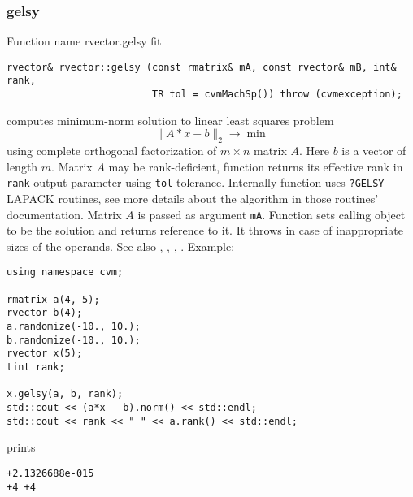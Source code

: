 \subsubsection{gelsy}
Function%
\pdfdest name {rvector.gelsy} fit
\begin{verbatim}
rvector& rvector::gelsy (const rmatrix& mA, const rvector& mB, int& rank,
                         TR tol = cvmMachSp()) throw (cvmexception);
\end{verbatim}
computes minimum-norm solution to linear
least squares problem 
\begin{equation*}
\|A*x-b\|_2\to\min
\end{equation*}
using complete orthogonal factorization of $m\times n$ matrix $A$.
Here $b$ is a vector of length $m$.
Matrix $A$ may be rank-deficient, function returns its effective rank in \verb"rank"
output parameter using \verb"tol" tolerance.
Internally  function uses \verb"?GELSY" LAPACK routines, see more details
about the algorithm in those routines' documentation.
Matrix $A$ is passed as argument \verb"mA".
Function sets calling object to be the solution and returns reference to it.
It throws
in case of inappropriate sizes of the operands.
See also , 
, , 
.
Example:
\begin{Verbatim}
using namespace cvm;

rmatrix a(4, 5);
rvector b(4);
a.randomize(-10., 10.);
b.randomize(-10., 10.);
rvector x(5);
tint rank;

x.gelsy(a, b, rank);
std::cout << (a*x - b).norm() << std::endl;
std::cout << rank << " " << a.rank() << std::endl;
\end{Verbatim}
prints
\begin{Verbatim}
+2.1326688e-015
+4 +4
\end{Verbatim}
\newpage


